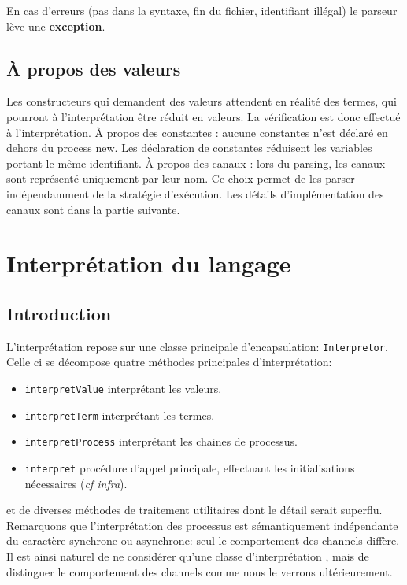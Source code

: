 \documentclass[11pt]{article} %
\begin{document}
En cas d'erreurs (pas dans la syntaxe, fin du fichier, identifiant illégal) le parseur lève une \textbf{exception}.

\subsection{À propos des valeurs}

 Les constructeurs qui demandent des valeurs attendent en réalité des termes, qui pourront à l'interprétation être réduit en valeurs. La vérification est donc effectué à l'interprétation.
À propos des constantes : aucune constantes n'est déclaré en dehors du process new. Les déclaration de constantes réduisent les variables portant le même identifiant.
À propos des canaux : lors du parsing, les canaux sont représenté uniquement par leur nom. Ce choix permet de les parser indépendamment de la stratégie d'exécution. Les détails d'implémentation des canaux sont dans la partie suivante.

\section{Interprétation du langage}

\subsection{Introduction}

  L'interprétation repose sur une classe principale d'encapsulation: \texttt{Interpretor}.  Celle ci se décompose quatre méthodes principales d'interprétation: 
\begin{itemize}
  \item \texttt{interpretValue} interprétant les valeurs.
  \item \texttt{interpretTerm} interprétant les termes.
  \item \texttt{interpretProcess} interprétant les chaines de processus.
  \item \texttt{interpret} procédure d'appel principale, effectuant les initialisations nécessaires (\emph{cf infra}).
\end{itemize}

et de diverses méthodes de traitement utilitaires dont le détail serait superflu. Remarquons que l'interprétation des processus est sémantiquement indépendante du caractère synchrone ou asynchrone: seul le comportement des channels diffère. Il est ainsi naturel de ne considérer qu'une classe d'interprétation , mais de distinguer le comportement des channels comme nous le verrons ultérieurement.
\end{document}
